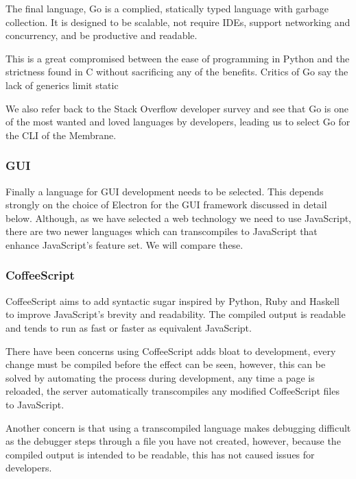 \documentclass[11pt, a4paper, twocolumn, twoside]{report}
\begin{document}
The final language, Go is a complied, statically typed language with garbage collection. It is designed to be scalable, not require IDEs, support networking and concurrency, and be productive and readable. \citep{golang2017faq}

This is a great compromised between the ease of programming in Python and the strictness found in C without sacrificing any of the benefits. Critics of Go say the lack of generics limit static

We also refer back to the Stack Overflow developer survey and see that Go is one of the most wanted and loved languages by developers, leading us to select Go for the CLI of the Membrane.

\subsubsection{GUI}

Finally a language for GUI development needs to be selected. This depends strongly on the choice of Electron for the GUI framework discussed in detail below. Although, as we have selected a web technology we need to use JavaScript, there are two newer languages which can transcompiles to JavaScript that enhance JavaScript's feature set. We will compare these.

\subsubsection{CoffeeScript}

CoffeeScript aims to add syntactic sugar inspired by Python, Ruby and Haskell to improve JavaScript's brevity and readability. \citep{maccaw2012little} The compiled output is readable and tends to run as fast or faster as equivalent JavaScript. \citep{coffeescript2017faq}

There have been concerns using CoffeeScript adds bloat to development, every change must be compiled before the effect can be seen, however, this can be solved by automating the process during development, any time a page is reloaded, the server automatically transcompiles any modified CoffeeScript files to JavaScript. \citep{wheeler2017coffeescript}

Another concern is that using a transcompiled language makes debugging difficult as the debugger steps through a file you have not created, however, because the compiled output is intended to be readable, this has not caused issues for developers. \citep{wheeler2017coffeescript}
\end{document}
